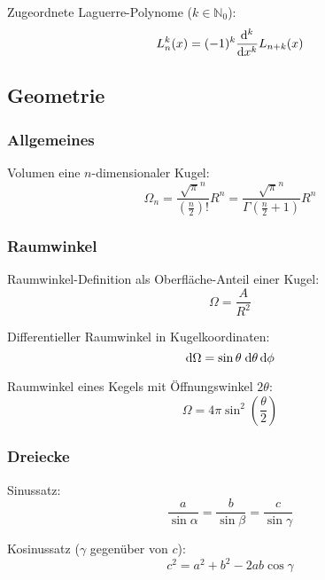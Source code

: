 \documentclass[11pt]{article}
\numberwithin{equation}{section}
\begin{document}
				\noindent
				Zugeordnete Laguerre-Polynome ($k\in\mathbb{N}_0$):
				\begin{equation}
					L_n^k(x) = (-1)^k\frac{\mathrm{d}^k}{\mathrm{d} x^k} L_{n+k}(x)
				\end{equation}

		\subsection{Geometrie}
			\subsubsection{Allgemeines}
				\noindent
				Volumen eine $n$-dimensionaler Kugel:
				\begin{equation}
					\Omega_n = \frac{\sqrt{\pi}^n}{\left(\frac{n}{2}\right)!}R^n
					= \frac{\sqrt{\pi}^n}{\Gamma\left(\frac{n}{2}+1\right)}R^n
				\end{equation}


			\subsubsection{Raumwinkel}
				\noindent
				Raumwinkel-Definition als Oberfläche-Anteil einer Kugel:
				\begin{equation}
					\Omega = \frac{A}{R^2}
				\end{equation}

				\noindent
				Differentieller Raumwinkel in Kugelkoordinaten:
				\begin{equation}
					\mathrm{d} \Omega = \sin\theta\;\mathrm{d} \theta \,\mathrm{d} \phi
				\end{equation}

				\noindent
				Raumwinkel eines Kegels mit Öffnungswinkel $2\theta$:
				\begin{equation}
					\Omega = 4\pi\sin^2\left(\frac{\theta}{2}\right)
				\end{equation}

			\subsubsection{Dreiecke}
				\noindent
				Sinussatz:
				\begin{equation}
					\frac{a}{\sin\alpha} = \frac{b}{\sin\beta} = \frac{c}{\sin\gamma}
				\end{equation}

				\noindent
				Kosinussatz ($\gamma$ gegenüber von $c$):
				\begin{equation}
					c^2 = a^2 + b^2 -2ab \cos\gamma
				\end{equation}
\end{document}
